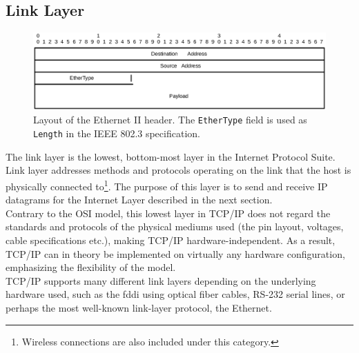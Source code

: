 \subsection{Link Layer}
\begin{figure}
\centering
\includegraphics[scale=0.75]{background/ethernet.eps}
\caption{Layout of the Ethernet II header. The \texttt{EtherType} field is used
as \texttt{Length} in the IEEE 802.3 specification.}
\label{fig:ethernet_header}
\end{figure}


The link layer is the lowest, bottom-most layer in the Internet Protocol Suite.
Link layer addresses methods and protocols operating on the link that the host
is physically connected to\footnote{Wireless connections are also included
under this category.}. The purpose of this layer is to send and receive IP
datagrams for the Internet Layer described in the next section.\\
Contrary to the OSI model, this lowest layer in TCP/IP
does not regard the standards and protocols of the physical mediums used
(the pin layout, voltages, cable specifications etc.), making TCP/IP
hardware-independent. As a result, TCP/IP can in theory be implemented on
virtually any hardware configuration, emphasizing the flexibility of the
model.\\
TCP/IP supports many different link layers depending on the underlying hardware
used, such as the \gls{fddi} using optical fiber cables\cite{RFC1103}, RS-232
serial lines\cite{tia_232}, or perhaps the most well-known link-layer protocol,
the Ethernet.

